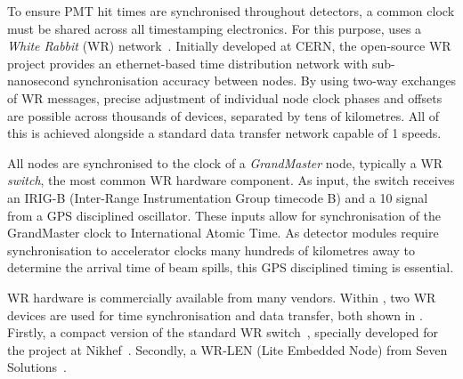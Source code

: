 To ensure PMT hit times are synchronised throughout \chips detectors, a common clock must be
shared across all timestamping electronics. For this purpose, \chips uses a \emph{White Rabbit}
(WR) network~\cite{lipinski2011}. Initially developed at CERN, the open-source WR project provides
an ethernet-based time distribution network with sub-nanosecond synchronisation accuracy between
nodes. By using two-way exchanges of WR messages, precise adjustment of individual node clock
phases and offsets are possible across thousands of devices, separated by tens of kilometres. All
of this is achieved alongside a standard data transfer network capable of \unit{1}{}
speeds.

All nodes are synchronised to the clock of a \emph{GrandMaster} node, typically a WR
\emph{switch}, the most common WR hardware component. As input, the switch receives an IRIG-B
(Inter-Range Instrumentation Group timecode B) and a \unit{10}{} signal from a GPS
disciplined oscillator. These inputs allow for synchronisation of the GrandMaster clock to
International Atomic Time. As \chips detector modules require synchronisation to accelerator
clocks many hundreds of kilometres away to determine the arrival time of beam spills, this GPS
disciplined timing is essential.

WR hardware is commercially available from many vendors. Within \chipsfive, two WR devices are
used for time synchronisation and data transfer, both shown in .
Firstly, a compact version of the standard WR switch~\cite{wrswitch2020}, specially developed for
the \chips project at Nikhef~\cite{wrchromium2020}. Secondly, a WR-LEN (Lite Embedded Node) from
Seven Solutions~\cite{wrlen2020}. 

